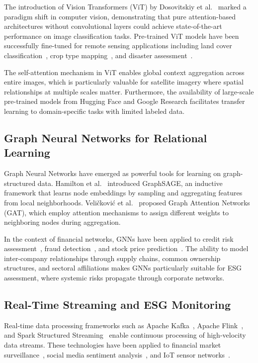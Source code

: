 The introduction of Vision Transformers (ViT) by Dosovitskiy et al.~\cite{dosovitskiy2020image} marked a paradigm shift in computer vision, demonstrating that pure attention-based architectures without convolutional layers could achieve state-of-the-art performance on image classification tasks. Pre-trained ViT models have been successfully fine-tuned for remote sensing applications including land cover classification~\cite{bazi2021vision}, crop type mapping~\cite{he2021vit}, and disaster assessment~\cite{zhao2021vision}.

The self-attention mechanism in ViT enables global context aggregation across entire images, which is particularly valuable for satellite imagery where spatial relationships at multiple scales matter. Furthermore, the availability of large-scale pre-trained models from Hugging Face and Google Research facilitates transfer learning to domain-specific tasks with limited labeled data.

\subsection{Graph Neural Networks for Relational Learning}

Graph Neural Networks have emerged as powerful tools for learning on graph-structured data. Hamilton et al.~\cite{hamilton2017inductive} introduced GraphSAGE, an inductive framework that learns node embeddings by sampling and aggregating features from local neighborhoods. Veličković et al.~\cite{veličković2017graph} proposed Graph Attention Networks (GAT), which employ attention mechanisms to assign different weights to neighboring nodes during aggregation.

In the context of financial networks, GNNs have been applied to credit risk assessment~\cite{yang2020credit}, fraud detection~\cite{liu2020fraud}, and stock price prediction~\cite{feng2020stock}. The ability to model inter-company relationships through supply chains, common ownership structures, and sectoral affiliations makes GNNs particularly suitable for ESG assessment, where systemic risks propagate through corporate networks.

\subsection{Real-Time Streaming and ESG Monitoring}

Real-time data processing frameworks such as Apache Kafka~\cite{kreps2011kafka}, Apache Flink~\cite{carbone2015flink}, and Spark Structured Streaming~\cite{armbrust2018spark} enable continuous processing of high-velocity data streams. These technologies have been applied to financial market surveillance~\cite{artikis2015flink}, social media sentiment analysis~\cite{zhao2016kafka}, and IoT sensor networks~\cite{zhang2018spark}.

